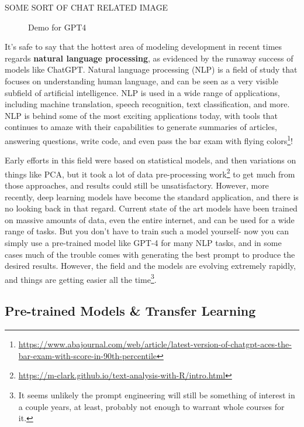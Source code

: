 \documentclass[
  letterpaper,
]{krantz}
\DeclareRobustCommand{\href}[2]{#2\footnote{\url{#1}}}
\begin{document}
SOME SORT OF CHAT RELATED IMAGE

\begin{figure}[H]


\caption{\label{fig-gpt4}Demo for GPT4}

\end{figure}%

It's safe to say that the hottest area of modeling development in recent
times regards \textbf{natural language processing}, as evidenced by the
runaway success of models like ChatGPT. Natural language processing
(NLP) is a field of study that focuses on understanding human language,
and can be seen as a very visible subfield of artificial intelligence.
NLP is used in a wide range of applications, including machine
translation, speech recognition, text classification, and more. NLP is
behind some of the most exciting applications today, with tools that
continues to amaze with their capabilities to generate summaries of
articles, answering questions, write code, and even
\href{https://www.abajournal.com/web/article/latest-version-of-chatgpt-aces-the-bar-exam-with-score-in-90th-percentile}{pass
the bar exam with flying colors}!

Early efforts in this field were based on statistical models, and then
variations on things like PCA, but it took a lot of
\href{https://m-clark.github.io/text-analysis-with-R/intro.html}{data
pre-processing work} to get much from those approaches, and results
could still be unsatisfactory. However, more recently, deep learning
models have become the standard application, and there is no looking
back in that regard. Current state of the art models have been trained
on massive amounts of data, even the entire internet, and can be used
for a wide range of tasks. But you don't have to train such a model
yourself- now you can simply use a pre-trained model like GPT-4 for many
NLP tasks, and in some cases much of the trouble comes with generating
the best prompt to produce the desired results. However, the field and
the models are evolving extremely rapidly, and things are getting easier
all the time\footnote{It seems unlikely the prompt engineering will
  still be something of interest in a couple years, at least, probably
  not enough to warrant whole courses for it.}.

\subsection{Pre-trained Models \& Transfer
Learning}\label{pre-trained-models-transfer-learning}
\end{document}

